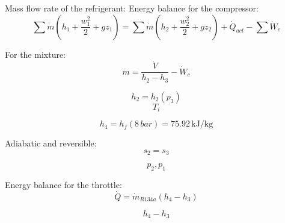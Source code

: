 Mass flow rate of the refrigerant:  
Energy balance for the compressor:  
\[ \sum \dot{m} \left( h_1 + \frac{w_1^2}{2} + g z_1 \right) = \sum \dot{m} \left( h_2 + \frac{w_2^2}{2} + g z_2 \right) + \dot{Q}_{act} - \sum \dot{W}_c \]  

For the mixture:  
\[ \dot{m} = \frac{\dot{V}}{h_2 - h_3} - \dot{W}_c \]  

\[ h_2 = h_2(p_3) \]  
\[ T_i \]  

\[ h_4 = h_f(8 \, bar) = 75.92 \, \text{kJ/kg} \]  

Adiabatic and reversible:  
\[ s_2 = s_3 \]  

\[ p_2, p_1 \]  

Energy balance for the throttle:  
\[ \dot{Q} = \dot{m}_{R134a} (h_4 - h_3) \]  

\[ h_4 - h_3 \]